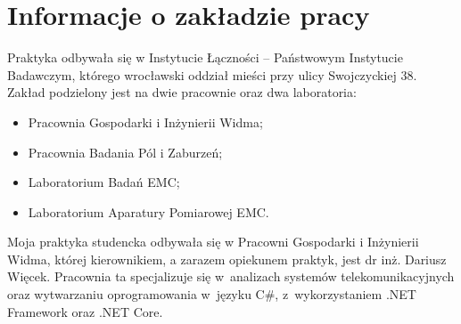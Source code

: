 \documentclass[12pt, a4paper, oneside]{article}
\begin{document}
\section{Informacje o zakładzie pracy}
\indent\indent Praktyka odbywała się w Instytucie Łączności – Państwowym Instytucie Badawczym, którego wrocławski oddział mieści przy ulicy Swojczyckiej 38. Zakład podzielony jest na dwie pracownie oraz dwa laboratoria:
\begin{itemize}
\item Pracownia Gospodarki i Inżynierii Widma;
\item Pracownia Badania Pól i Zaburzeń;
\item Laboratorium Badań EMC;
\item Laboratorium Aparatury Pomiarowej EMC.
\end{itemize}
\indent\indent Moja praktyka studencka odbywała się w Pracowni Gospodarki i Inżynierii Widma, której kierownikiem, a zarazem opiekunem praktyk, jest dr inż. Dariusz Więcek. Pracownia ta specjalizuje się w~analizach systemów telekomunikacyjnych oraz wytwarzaniu oprogramowania w~języku C\#, z~wykorzystaniem .NET Framework oraz .NET Core.
\end{document}
